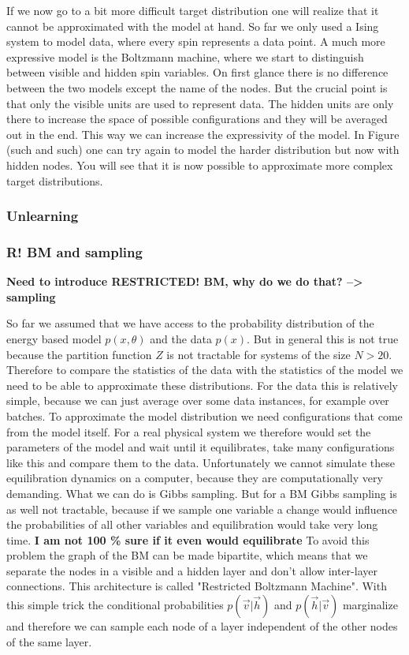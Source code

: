 \documentclass[nofootinbib, superscriptaddress, prl]{revtex4}
\begin{document}
If we now go to a bit more difficult target distribution one will realize that it cannot be approximated with the model at hand. So far we only used a Ising system to model data, where every spin represents a data point. A much more expressive model is the Boltzmann machine, where we start to distinguish between visible and hidden spin variables. On first glance there is no difference between the two models except the name of the nodes. But the crucial point is that only the visible units are used to represent data. The hidden units are only there to increase the space of possible configurations and they will be averaged out in the end. This way we can increase the expressivity of the model. In Figure (such and such) one can try again to model the harder distribution but now with hidden nodes. You will see that it is now possible to approximate more complex target distributions.

\subsubsection{Unlearning}

\subsubsection{R! BM and sampling}

 \textbf{Need to introduce RESTRICTED! BM, why do we do that? --> sampling}

So far we assumed that we have access to the probability distribution of the energy based model $p(x, \theta)$ and the data $p(x)$. But in general this is not true because the partition function $Z$ is not tractable for systems of the size $N>20$. Therefore to compare the statistics of the data with the statistics of the model we need to be able to approximate these distributions. For the data this is relatively simple, because we can just average over some data instances, for example over batches. To approximate the model distribution we need configurations that come from the model itself. For a real physical system we therefore would set the parameters of the model and wait until it equilibrates, take many configurations like this and compare them to the data. 
Unfortunately we cannot simulate these equilibration dynamics on a computer, because they are computationally very demanding. What we can do is Gibbs sampling. But for a BM Gibbs sampling is as well not tractable, because if we sample one variable a change would influence the probabilities of all other variables and equilibration would take very long time. \textbf{I am not 100 \% sure if it even would equilibrate} To avoid this problem the graph of the BM can be made bipartite, which means that we separate the nodes in a visible and a hidden layer and don't allow inter-layer connections. This architecture is called "Restricted Boltzmann Machine". With this simple trick the conditional probabilities $p(\vec{v}|\vec{h})$ and $p(\vec{h}|\vec{v})$ marginalize and therefore we can sample each node of a layer independent of the other nodes of the same layer. 
\end{document}
